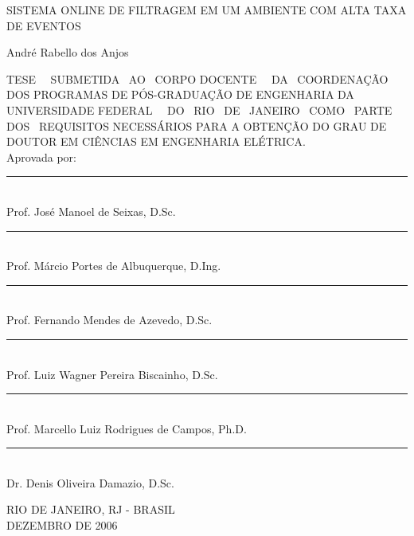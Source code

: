 \begin{titlepage}
\begin{center}
{ SISTEMA ONLINE DE FILTRAGEM EM UM AMBIENTE COM ALTA TAXA DE EVENTOS }

\vspace*{1.0cm}
{André Rabello dos Anjos}
\end{center}
\vspace*{1.0cm}

{ \noindent 
TESE~~ SUBMETIDA~ AO~ CORPO DOCENTE~~ DA~ COORDENAÇÃO~ DOS
PROGRAMAS DE PÓS-GRADUAÇÃO DE ENGENHARIA DA \mbox{UNIVERSIDADE} FEDERAL~~ DO~
RIO~ DE~ JANEIRO~ COMO~ PARTE~ DOS~ REQUISITOS \mbox{NECESSÁRIOS} PARA A
OBTENÇÃO DO GRAU DE DOUTOR EM CIÊNCIAS EM ENGENHARIA ELÉTRICA. }  \\

\noindent Aprovada por:
\vspace{1.0cm} %

\begin{flushright}
\parbox{10cm}
{
\begin{center}

\rule{10cm}{.02cm} \\
Prof. José Manoel de Seixas, D.Sc.
\vspace{.20in}

\rule{10cm}{.02cm} \\
Prof. Márcio Portes de Albuquerque, D.Ing.
\vspace{.20in}

\rule{10cm}{.02cm} \\
Prof. Fernando Mendes de Azevedo, D.Sc.
\vspace{.20in}

\rule{10cm}{.02cm} \\
Prof. Luiz Wagner Pereira Biscainho, D.Sc.
\vspace{.20in}

\rule{10cm}{.02cm} \\
Prof. Marcello Luiz Rodrigues de Campos, Ph.D.
\vspace{.20in}

\rule{10cm}{.02cm} \\
Dr. Denis Oliveira Damazio, D.Sc.
\vspace{.20in}

\end{center}
}
\end{flushright}
\vspace{-.5cm}

\vfill
\begin{center}
RIO DE JANEIRO, RJ - BRASIL \\
DEZEMBRO DE 2006
\end{center}

\end{titlepage}
